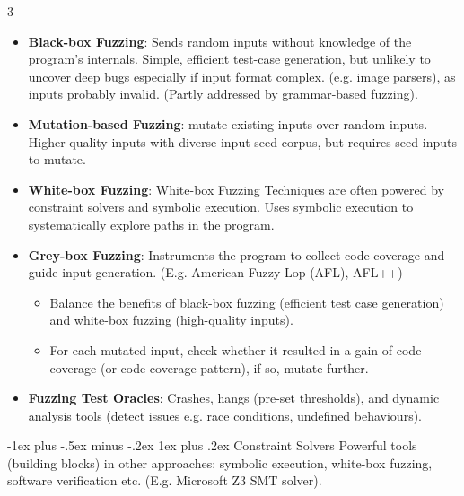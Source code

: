 \documentclass[a4paper, 10pt, landscape]{article}
\makeatletter
\renewcommand{\subsubsection}{\@startsection{subsubsection}{3}{0mm}%
                                {-1ex plus -.5ex minus -.2ex}%
                                {1ex plus .2ex}%
                                {\normalfont\small\bfseries}}
\makeatother
\begin{document}
\begin{multicols*}{3}
\begin{itemize}
\item \textbf{Black-box Fuzzing}: Sends random inputs without knowledge of the program's internals. Simple, efficient test-case generation, but unlikely to uncover deep bugs especially if input format complex. (e.g. image parsers), as inputs probably invalid. (Partly addressed by grammar-based fuzzing).
\item \textbf{Mutation-based Fuzzing}: mutate existing inputs over random inputs. Higher quality inputs with diverse input seed corpus, but requires seed inputs to mutate.
\item \textbf{White-box Fuzzing}:  White-box Fuzzing Techniques are often powered by constraint 
solvers and symbolic execution. Uses symbolic execution to systematically explore paths in the program.
\item \textbf{Grey-box Fuzzing}: Instruments the program to collect code coverage and guide input generation.  (E.g.  American Fuzzy Lop (AFL), AFL++)
	\begin{itemize}
	\item  Balance the benefits of black-box fuzzing (efficient test case generation) and white-box fuzzing (high-quality inputs). 
	\item For each mutated input, check whether it resulted in a gain of code coverage (or code coverage pattern), if so, mutate further.
	\end{itemize}
\item \textbf{Fuzzing Test Oracles}:  Crashes, hangs (pre-set thresholds), and dynamic analysis tools (detect issues e.g. race conditions, undefined behaviours).
\end{itemize}

\subsubsection{Constraint Solvers}
Powerful tools (building blocks) in other approaches: symbolic execution, white-box fuzzing, software verification etc. (E.g. Microsoft Z3 SMT solver).


\end{multicols*}
\end{document}
